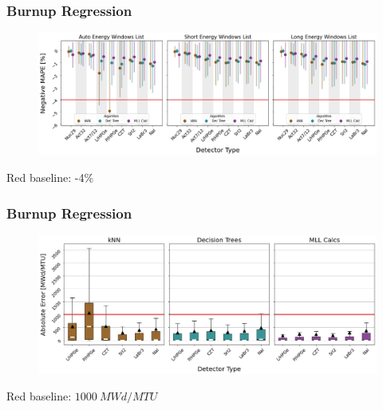 \begin{frame}
  \frametitle{Burnup Regression}
  \begin{adjustwidth}{-15pt}{-10pt}
  \begin{figure}
    \centering
    \includegraphics[width=1.1\textwidth]{./figures/detector_preds_wrt_enlist_MAPE_burn.png}
  \end{figure}
  \vspace{12pt} \centering Red baseline: -4\% %
  \end{adjustwidth}
\end{frame}

\begin{frame}
  \frametitle{Burnup Regression}
  \begin{adjustwidth}{-15pt}{-10pt}
  \begin{figure}
    \centering
    \includegraphics[width=1.1\textwidth]{./figures/abserror_boxplots_auto_burn.png}
  \end{figure}
  \vspace{12pt} \centering Red baseline: $1000\:MWd/MTU$
  \end{adjustwidth}
\end{frame}

